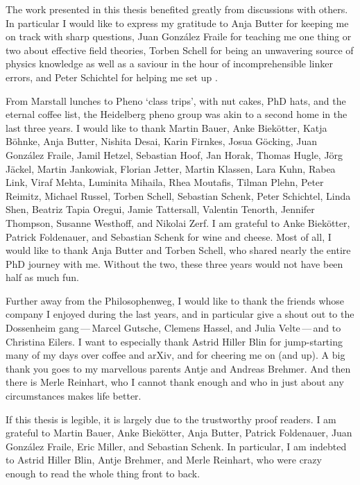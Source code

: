 The work presented in this thesis benefited greatly from discussions
with others. In particular I would like to express my gratitude to
Anja Butter for keeping me on track with sharp questions, Juan
Gonz\'alez Fraile for teaching me one thing or two about effective
field theories, Torben Schell for being an unwavering source of physics
knowledge as well as a saviour in the hour of incomprehensible linker
errors, and Peter Schichtel for helping me set up
.

From Marstall lunches to Pheno `class trips', with nut cakes, PhD
hats, and the eternal coffee list, the Heidelberg pheno group was akin
to a second home in the last three years. I would like to thank Martin
Bauer, Anke Biek\"otter, Katja B\"ohnke, Anja Butter, Nishita Desai,
Karin Firnkes, Josua G\"ocking, Juan Gonz\'alez Fraile, Jamil Hetzel,
Sebastian Hoof, Jan Horak, Thomas Hugle, J\"org J\"ackel, Martin
Jankowiak, Florian Jetter, Martin Klassen, Lara Kuhn, Rabea Link,
Viraf Mehta, Luminita Mihaila, Rhea Moutafis, Tilman Plehn, Peter
Reimitz, Michael Russel, Torben Schell, Sebastian Schenk, Peter
Schichtel, Linda Shen, Beatriz Tapia Oregui, Jamie Tattersall,
Valentin Tenorth, Jennifer Thompson, Susanne Westhoff, and Nikolai
Zerf. I am grateful to Anke Biek\"otter, Patrick Foldenauer, and
Sebastian Schenk for wine and cheese. Most of
all, I would like to thank Anja Butter and Torben Schell, who shared
nearly the entire PhD journey with me. Without the two, these three
years would not have been half as much fun.

Further away from the Philosophenweg, I would like to thank the
friends whose company I enjoyed during the last years, and in
particular give a shout out to the Dossenheim gang\,---\,Marcel
Gutsche, Clemens Hassel, and Julia Velte\,---\,and to Christina
Eilers. I want to especially thank Astrid Hiller Blin for
jump-starting many of my days over coffee and arXiv, and for cheering
me on (and up). A big thank you goes to my marvellous parents Antje
and Andreas Brehmer. And then there is Merle Reinhart, who I cannot
thank enough and who in just about any circumstances makes life
better.

If this thesis is legible, it is largely due to the trustworthy proof
readers. I am grateful to Martin Bauer, Anke Biek\"otter, Anja Butter,
Patrick Foldenauer, Juan Gonz\'alez Fraile, Eric Miller, and Sebastian
Schenk. In particular, I am indebted to Astrid Hiller Blin, Antje
Brehmer, and Merle Reinhart, who were crazy enough to read the whole
thing front to back.

